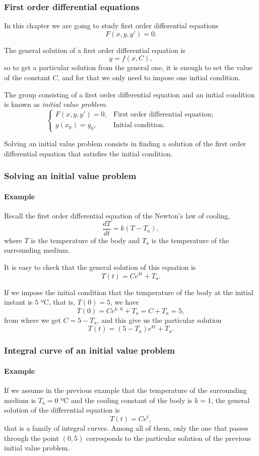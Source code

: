 \begin{frame}
\frametitle{First order differential equations}
In this chapter we are going to study first order differential equations
\[
F(x,y,y')=0.
\]

The general solution of a first order differential equation is
\[
y = f (x,C),
\]
so to get a particular solution from the general one, it is enough to set the value of the constant $C$, and for that we only need to impose one initial condition.

\begin{definition}
The group consisting of a first order differential equation and an initial condition is known as \emph{initial value problem}:
\[
\begin{cases}
F(x,y,y')=0, & \mbox{First order differential equation;} \\
y(x_0)=y_0, & \mbox{Initial condition.}
\end{cases}
\]
\end{definition}

Solving an initial value problem consists in finding a solution of the first order differential equation that satisfies the initial condition.
\end{frame}


\begin{frame}
\frametitle{Solving an initial value problem}
\framesubtitle{Example}
Recall the first order differential equation of the Newton's law of cooling,
\[
\frac{dT}{dt}=k(T-T_a),
\]
where $T$ is the temperature of the body and $T_a$ is the temperature of the surrounding medium.

It is easy to check that the general solution of this equation is 
\[T(t) = Ce^{kt}+T_a.\]

If we impose the initial condition that the temperature of the body at the initial instant is $5$ ºC, that is, $T(0)=5$, we have
\[T(0) = Ce^{k\cdot0}+T_a = C+T_a = 5,\]
from where we get $C=5-T_a$, and this give us the particular solution
\[
T(t) = (5-T_a)e^{kt}+T_a.
\]
\end{frame}


\begin{frame}
\frametitle{Integral curve of an initial value problem}
\framesubtitle{Example}
If we assume in the previous example that the temperature of the surrounding medium is $T_a=0$ ºC and the cooling constant of the body is $k=1$, the general solution of the differential equation is
\[T(t)=Ce^t,\]
that is a family of integral curves.
Among all of them, only the one that passes through the point $(0,5)$ corresponds to the particular solution of the previous initial value problem. 
\begin{center}

\end{center}
\end{frame}


